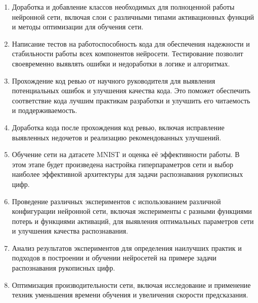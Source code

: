 \documentclass{article}
\begin{document}
\begin{enumerate}
    \item Доработка и добавление классов необходимых для полноценной работы нейронной сети, включая слои с различными типами активационных функций и методы оптимизации для обучения сети.

    \item Написание тестов на работоспособность кода для обеспечения надежности и стабильности работы всех компонентов нейросети. Тестирование позволит своевременно выявлять ошибки и недоработки в логике и алгоритмах.
    
    \item Прохождение код ревью от научного руководителя для выявления потенциальных ошибок и улучшения качества кода. Это поможет обеспечить соответствие кода лучшим практикам разработки и улучшить его читаемость и поддерживаемость.
    
    \item Доработка кода после прохождения код ревью, включая исправление выявленных недочетов и реализацию рекомендованных улучшений.
    
    \item Обучение сети на датасете MNIST и оценка её эффективности работы. В этом этапе будет произведена настройка гиперпараметров сети и выбор наиболее эффективной архитектуры для задачи распознавания рукописных цифр.
    
    \item Проведение различных экспериментов с использованием различной конфигурации нейронной сети, включая эксперименты с разными функциями потерь и функциями активаций, для выявления оптимальных параметров сети и улучшения качества распознавания.
    
    \item Анализ результатов экспериментов для определения наилучших практик и подходов в построении и обучении нейросетей на примере задачи распознавания рукописных цифр.
    
    \item Оптимизация производительности сети, включая исследование и применение техник уменьшения времени обучения и увеличения скорости предсказания.
\end{enumerate}

\newpage
% 




\end{document}
